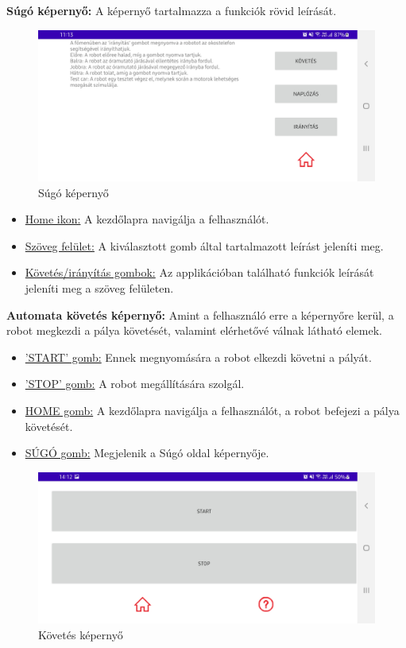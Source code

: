\documentclass[]{thesis-ekf}
\theoremstyle{definition}
\begin{document}
\textbf{Súgó képernyő:} A képernyő tartalmazza a funkciók rövid leírását.
\begin{figure}[h]
	\centering
	\includegraphics[width=\columnwidth]{images/app_screen/help_screen}
	\caption{Súgó képernyő}
	\label{help-screen}
\end{figure}
\begin{itemize}
	\item \underline{Home ikon:} A kezdőlapra navigálja a felhasználót.
	\item \underline{Szöveg felület:} A kiválasztott gomb által tartalmazott leírást jeleníti meg.
	\item \underline{Követés/irányítás gombok:} Az applikációban található funkciók leírását jeleníti meg a szöveg felületen.
\end{itemize}

\textbf{Automata követés képernyő:} Amint a felhasználó erre a képernyőre kerül, a robot megkezdi a pálya követését, valamint elérhetővé válnak  látható elemek.
\begin{itemize}
	\item \underline{’START’ gomb:} Ennek megnyomására a robot elkezdi követni a pályát.
	\item \underline{'STOP' gomb:} A robot megállítására szolgál.
	\item \underline{HOME gomb:} A kezdőlapra navigálja a felhasználót, a robot befejezi a pálya követését.
	\item \underline{SÚGÓ gomb:} Megjelenik a Súgó oldal képernyője.
\end{itemize}
\begin{figure}[h]
\centering
\includegraphics[width=\columnwidth]{images/app_screen/follow_screen}
\caption{Követés képernyő}
\label{follow-screen}
\end{figure}
\end{document}
